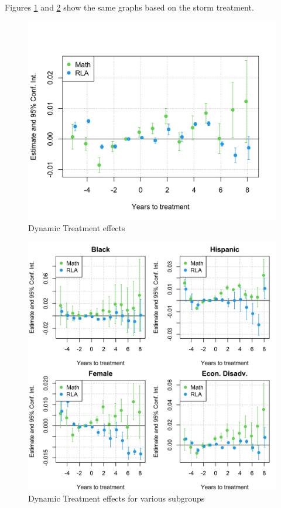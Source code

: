 Figures \ref{ResultsPlotStorm} and \ref{ResultsPlotSubStorm} show the same graphs based on the storm treatment.


\begin{figure}[!h]
	\centering
	\includegraphics[scale=1]{"../Code & Data/ResultsPlotStorm.png"}
	\caption{Dynamic Treatment effects}
	\label{ResultsPlotStorm}
\end{figure}

\begin{figure}[!h]
	\centering
	\includegraphics[scale=1]{"../Code & Data/ResultsPlotSubStorm.png"}
	\caption{Dynamic Treatment effects for various subgroups}
	\label{ResultsPlotSubStorm}
\end{figure}








